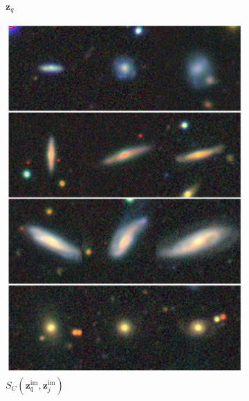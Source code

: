 \documentclass[draft, a4paper,12pt]{article}
\begin{document}
\begin{figure}[H]
\begin{subfigure}{0.08\textwidth}
        \caption{$\mathbf{z}_q$}
        \label{fig:retrieval_1}
    \end{subfigure}%
    \hfill
    \begin{subfigure}{0.22\textwidth}
        \centering
        \includegraphics[height=0.21\textheight]{../figures/images_im_im.png}
        \caption{$S_C(\mathbf{z}_q^{\text{im}}, \mathbf{z}_j^{\text{im}})$}
        \label{fig:retrieval_2}
    \end{subfigure}%
    \hfill
    \begin{subfigure}{0.22\textwidth}
        \centering

\end{subfigure}
\end{figure}
\end{document}
